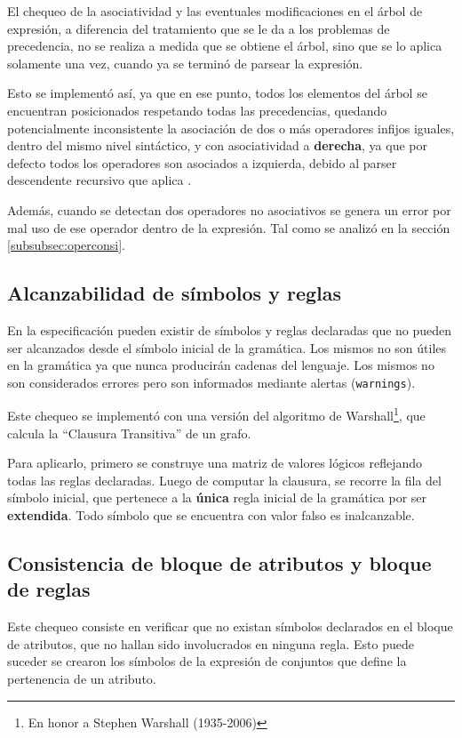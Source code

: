 El chequeo de la asociatividad y las eventuales modificaciones en el árbol de expresión, a diferencia del tratamiento que se le da a los problemas de precedencia, no se realiza a medida que se obtiene el árbol, sino que se lo aplica solamente una vez, cuando ya se terminó de parsear la expresión.

Esto se implementó así, ya que en ese punto, todos los elementos del árbol se encuentran posicionados respetando todas las precedencias, quedando potencialmente inconsistente la asociación de dos o más operadores infijos iguales, dentro del mismo nivel sintáctico, y con asociatividad a \textbf{derecha}, ya que por defecto todos los operadores son asociados a izquierda, debido al parser descendente recursivo que aplica \spirit.

Además, cuando se detectan dos operadores no asociativos se genera un error por mal uso de ese operador dentro de la expresión. Tal como se analizó en la sección \ref{subsubsec:operconsi}.

\subsection{Alcanzabilidad de símbolos y reglas}

En la especificación pueden existir de símbolos y reglas declaradas que no pueden ser alcanzados desde el símbolo inicial de la gramática. Los mismos no son útiles en la gramática ya que nunca producirán cadenas del lenguaje. Los mismos no son considerados errores pero son informados mediante alertas (\texttt{warnings}).

Este chequeo se implementó con una versión del algoritmo de Warshall\footnote{En honor a Stephen Warshall (1935-2006)}, que calcula la ``Clausura Transitiva'' de un grafo.

Para aplicarlo, primero se construye una matriz de valores lógicos reflejando todas las reglas declaradas. Luego de computar la clausura, se recorre la fila del símbolo inicial, que pertenece a la \textbf{única} regla inicial de la gramática por ser \textbf{extendida}. Todo símbolo que se encuentra con valor falso es inalcanzable.

\subsection{Consistencia de bloque de atributos y bloque de reglas}

Este chequeo consiste en verificar que no existan símbolos declarados en el bloque de atributos, que no hallan sido involucrados en ninguna regla. Esto puede suceder se crearon los símbolos de la expresión de conjuntos que define la pertenencia de un atributo.

